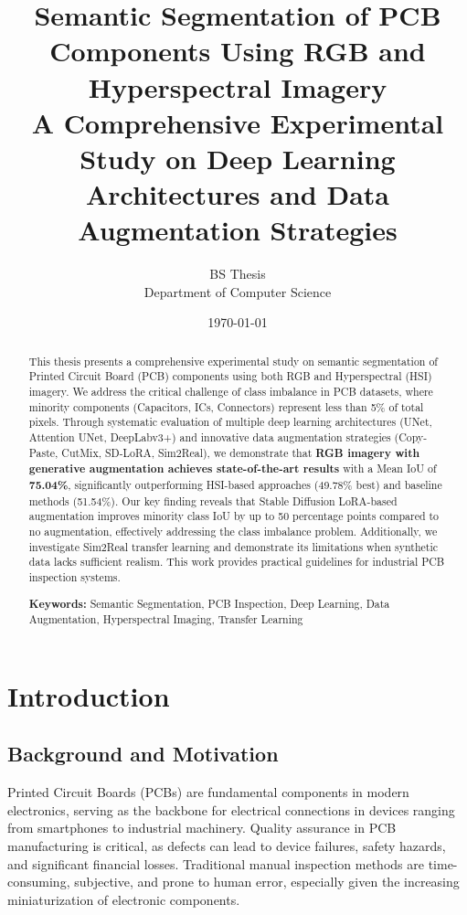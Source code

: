\documentclass[12pt,a4paper]{article}
\title{
    \textbf{Semantic Segmentation of PCB Components Using RGB and Hyperspectral Imagery} \\
    \large A Comprehensive Experimental Study on Deep Learning Architectures and Data Augmentation Strategies
}
\author{
    BS Thesis \\
    Department of Computer Science
}
\date{\today}
\begin{document}
\maketitle

\begin{abstract}
This thesis presents a comprehensive experimental study on semantic segmentation of Printed Circuit Board (PCB) components using both RGB and Hyperspectral (HSI) imagery. We address the critical challenge of class imbalance in PCB datasets, where minority components (Capacitors, ICs, Connectors) represent less than 5\% of total pixels. Through systematic evaluation of multiple deep learning architectures (UNet, Attention UNet, DeepLabv3+) and innovative data augmentation strategies (Copy-Paste, CutMix, SD-LoRA, Sim2Real), we demonstrate that \textbf{RGB imagery with generative augmentation achieves state-of-the-art results} with a Mean IoU of \textbf{75.04\%}, significantly outperforming HSI-based approaches (49.78\% best) and baseline methods (51.54\%). Our key finding reveals that Stable Diffusion LoRA-based augmentation improves minority class IoU by up to 50 percentage points compared to no augmentation, effectively addressing the class imbalance problem. Additionally, we investigate Sim2Real transfer learning and demonstrate its limitations when synthetic data lacks sufficient realism. This work provides practical guidelines for industrial PCB inspection systems.

\textbf{Keywords:} Semantic Segmentation, PCB Inspection, Deep Learning, Data Augmentation, Hyperspectral Imaging, Transfer Learning
\end{abstract}

\newpage
\tableofcontents
\newpage

\section{Introduction}

\subsection{Background and Motivation}

Printed Circuit Boards (PCBs) are fundamental components in modern electronics, serving as the backbone for electrical connections in devices ranging from smartphones to industrial machinery. Quality assurance in PCB manufacturing is critical, as defects can lead to device failures, safety hazards, and significant financial losses. Traditional manual inspection methods are time-consuming, subjective, and prone to human error, especially given the increasing miniaturization of electronic components.
\end{document}
